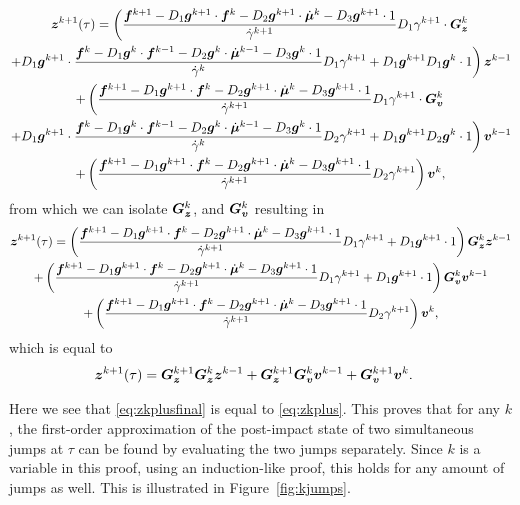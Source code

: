 \documentclass[../DC2017114Bouma.tex]{subfiles}
\begin{document}
\begin{multline}
\zb^{k+1}(\tau) = \left(\frac{\fb^{k+1} - D_1\gb^{k+1}\cdot\fb^{k} - D_2\gb^{k+1}\cdot\dot{\mub}^{k} - D_3\gb^{k+1}\cdot 1}{\dot{\gamma}^{k+1}}D_1\gamma^{k+1}\cdot\Gb_\zb^{k}\right.\\
\left. + D_1\gb^{k+1}\cdot\frac{\fb^{k} - D_1\gb^{k}\cdot\fb^{k-1} - D_2\gb^{k}\cdot\dot{\mub}^{k-1} - D_3\gb^{k}\cdot 1}{\dot{\gamma}^{k}}D_1\gamma^{k+1} + D_1\gb^{k+1} D_1\gb^{k}\cdot 1\right)\zb^{k-1}\\
+ \left(\frac{\fb^{k+1}-D_1\gb^{k+1}\cdot\fb^{k} -D_2\gb^{k+1}\cdot\dot{\mub}^{k} - D_3\gb^{k+1}\cdot 1}{\dot{\gamma}^{k+1}}D_1\gamma^{k+1}\cdot\Gb_\vb^{k}\right.\\
\left. + D_1\gb^{k+1}\cdot\frac{\fb^{k}-D_1\gb^{k}\cdot\fb^{k-1}-D_2\gb^{k}\cdot\dot{\mub}^{k-1}-D_3\gb^{k}\cdot 1}{\dot{\gamma}^{k}}D_2\gamma^{k+1} + D_1\gb^{k+1} D_2\gb^{k}\cdot 1 \right)\vb^{k-1}\\
+ \left(\frac{\fb^{k+1}-D_1\gb^{k+1}\cdot\fb^{k} - D_2\gb^{k+1}\cdot\dot{\mub}^{k} - D_3\gb^{k+1}\cdot 1}{\dot{\gamma}^{k+1}}D_2\gamma^{k+1}\right)\vb^{k},
\end{multline}
from which we can isolate $\Gb_\zb^{k}$, and $\Gb_\vb^{k}$ resulting in
\begin{multline}
\zb^{k+1}(\tau) = \left(\frac{\fb^{k+1} - D_1\gb^{k+1}\cdot\fb^{k}  - D_2\gb^{k+1}\cdot\dot{\mub}^{k} - D_3\gb^{k+1}\cdot 1}{\dot{\gamma}^{k+1}}D_1\gamma^{k+1} + D_1\gb^{k+1}\cdot 1\right)\Gb_\zb^{k}\zb^{k-1}\\
+ \left(\frac{\fb^{k+1} - D_1\gb^{k+1}\cdot\fb^{k} - D_2\gb^{k+1}\cdot\dot{\mub}^{k} - D_3\gb^{k+1}\cdot 1}{\dot{\gamma}^{k+1}}D_1\gamma^{k+1} + D_1\gb^{k+1}\cdot 1\right)\Gb_\vb^{k}\vb^{k-1} \\
+ \left(\frac{\fb^{k+1}-D_1\gb^{k+1}\cdot\fb^{k} - D_2\gb^{k+1}\cdot\dot{\mub}^{k} - D_3\gb^{k+1}\cdot 1}{\dot{\gamma}^{k+1}}D_2\gamma^{k+1}\right)\vb^{k},
\end{multline}
which is equal to
\begin{align}
&\zb^{k+1}(\tau) = \Gb_\zb^{k+1}\Gb_\zb^k\zb^{k-1} + \Gb_\zb^{k+1}\Gb_\vb^k\vb^{k-1} + \Gb_\vb^{k+1}\vb^{k}.\label{eq:zkplusfinal}
\end{align}

Here we see that \eqref{eq:zkplusfinal} is equal to \eqref{eq:zkplus}. This proves that for any $k$, the first-order approximation of the post-impact state of two simultaneous jumps at $\tau$ can be found by evaluating the two jumps separately. Since $k$ is a variable in this proof, using an induction-like proof, this holds for any amount of jumps as well. This is illustrated in Figure~\ref{fig:kjumps}. 
\end{document}

